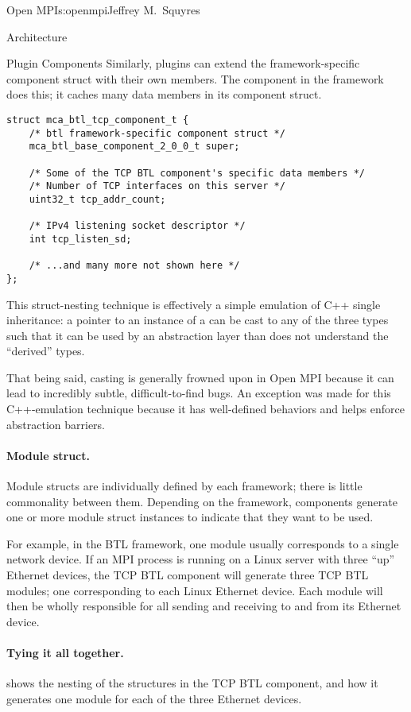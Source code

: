 \begin{aosachapter}{Open MPI}{s:openmpi}{Jeffrey M.\ Squyres}
\begin{aosasect1}{Architecture}
\begin{aosasect2}{Plugin Components}
Similarly, plugins can extend the framework-specific component struct
with their own members.
%
The  component in the  framework does this; it
caches many data members in its component struct.

\begin{verbatim}
struct mca_btl_tcp_component_t {
    /* btl framework-specific component struct */ 
    mca_btl_base_component_2_0_0_t super;

    /* Some of the TCP BTL component's specific data members */
    /* Number of TCP interfaces on this server */
    uint32_t tcp_addr_count;
    
    /* IPv4 listening socket descriptor */
    int tcp_listen_sd;

    /* ...and many more not shown here */
};
\end{verbatim}

This struct-nesting technique is effectively a simple emulation of C++
single inheritance: a pointer to an instance of a  can be cast to any of the
three types such that it can be used by an abstraction layer than does
not understand the ``derived'' types.

That being said, casting is generally frowned upon in Open MPI because
it can lead to incredibly subtle, difficult-to-find bugs.  
%
An exception was made for this C++-emulation technique because it has
well-defined behaviors and helps enforce abstraction barriers.


\paragraph{Module struct.}

Module structs are individually defined by each framework; there is
little commonality between them.
%
Depending on the framework, components generate one or more module
struct instances to indicate that they want to be used.

For example, in the BTL framework, one module usually corresponds to a
single network device.  
%
If an MPI process is running on a Linux server with three ``up''
Ethernet devices, the TCP BTL component will generate three TCP BTL
modules; one corresponding to each Linux Ethernet device.
%
Each module will then be wholly responsible for all sending and
receiving to and from its Ethernet device.


\paragraph{Tying it all together.}
 shows the nesting of the
structures in the TCP BTL component, and how it generates one module
for each of the three Ethernet devices.


\end{aosasect2}
\end{aosasect1}
\end{aosachapter}
